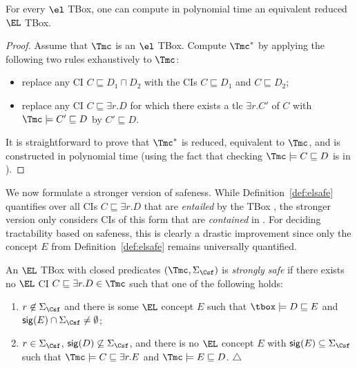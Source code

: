 \documentclass{lmcs}
\theoremstyle{definition}
\begin{document}
% 
\begin{lem}\label{lem:reducee}
For every $\el$ TBox, one can compute in polynomial time an equivalent reduced $\EL$ TBox.
\end{lem}
\begin{proof}
Assume that $\Tmc$ is an $\el$ TBox. Compute $\Tmc^*$ by applying the following two rules exhaustively to $\Tmc$:
\begin{itemize}
\item replace any CI $C \sqsubseteq D_1 \sqcap D_2$ with the CIs $C \sqsubseteq D_1$
and $C \sqsubseteq D_2$;
\item replace any CI $C \sqsubseteq \exists r .D$ for which there exists a tlc $\exists r.C'$ of $C$ with $\Tmc\models C'\sqsubseteq D$
by $C'\sqsubseteq D$.
\end{itemize}
It is straightforward to prove that $\Tmc^{\ast}$ is reduced, equivalent to $\Tmc$, and is constructed in polynomial time
(using the fact that checking $\Tmc\models C \sqsubseteq D$ is in \ptime \cite{BaBrLu-IJCAI-05}).
\end{proof}
%
We now formulate a stronger version of safeness. While
Definition~\ref{def:elsafe} quantifies over all CIs
$C \sqsubseteq \exists r . D$ that are \emph{entailed} by the TBox
\Tmc, the stronger version only considers CIs of this form that are
\emph{contained} in \Tmc. For deciding tractability based on safeness,
this is clearly a drastic improvement since only the concept $E$
from Definition~\ref{def:elsafe} remains universally quantified.
%
\begin{defi}\label{def:elstrongsafe}
  An $\EL$ TBox with closed predicates $(\Tmc,\Sigma_\Csf)$ is
  \emph{strongly safe} if there exists no $\EL$ CI $C \sqsubseteq \exists r.D \in \Tmc$ such 
  that one of the following holds:
\begin{enumerate}
  \renewcommand{\theenumi}{(st\arabic{enumi})}
  \renewcommand{\labelenumi}{\theenumi}
\item\label{it:rw_cond1} $r\not\in\Sigma_\Csf$ and there is some $\EL$ concept
  $E$ such that $\tbox\models D\sqsubseteq E$ and ${\sf sig}(E)
  \cap \Sigma_\Csf\not=\emptyset$;
\item \label{it:rw_cond2} $r\in \Sigma_\Csf$, ${\sf sig}(D)
  \not\subseteq\Sigma_\Csf$, and there is no $\EL$ concept $E$ with ${\sf sig}(E) \subseteq \Sigma_\Csf$ such that
  $\Tmc\models C \sqsubseteq \exists r.E$ and $\Tmc\models
  E \sqsubseteq D$. \hfill$\triangle$
\end{enumerate}

\end{defi}
%
\end{document}
